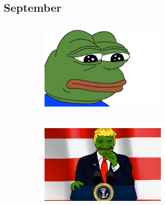 \documentclass[twoside]{article}
\begin{document}
\subsection{September}
\centering
    \vskip2cm
    \begin{figure}[H]
      \centering
      \begin{subfigure}{.4\textwidth}
        \centering
        \includegraphics[width=6cm,height=4.5cm]{images/articles/pepe0.jpg}
        \end{subfigure}%
        \begin{subfigure}{.4\textwidth}
          \centering
          \includegraphics[width=6cm,height=4.5cm]{images/articles/pepe1.jpg}
        \end{subfigure}%
      \end{figure}
\end{document}
